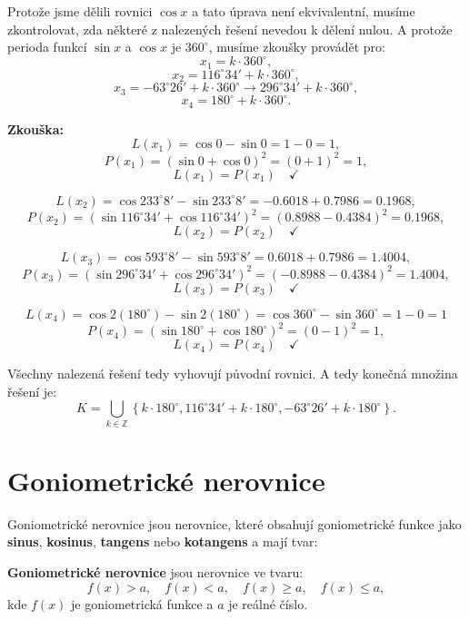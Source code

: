 \documentclass[12pt,a4paper]{article}
\begin{document}
\begin{examplebox}
    \bigskip
    Protože jsme dělili rovnici $\cos x$ a tato úprava není ekvivalentní,
    musíme zkontrolovat, zda některé z nalezených řešení nevedou k dělení nulou.
    A protože perioda funkcí $\sin x$ a $\cos x$ je $360^\circ$, musíme zkoušky provádět pro:
    \[
    x_1 = k \cdot 360^\circ,
    \]
    \[
    x_2 = 116^\circ 34' + k\cdot 360^\circ,
    \]
    \[
    x_3 = -63^\circ 26' + k\cdot 360^\circ \rightarrow 296^\circ 34' + k\cdot 360^\circ,
    \]
    \[
    x_4 = 180^\circ + k\cdot 360^\circ.
    \]

    \textbf{Zkouška:}
    \[
    L(x_1) = \cos 0 - \sin 0 = 1 - 0 = 1,
    \]
    \[
    P(x_1) = (\sin 0 + \cos 0)^2 = (0 + 1)^2 = 1,
    \]
    \[
    L(x_1) = P(x_1) \quad \checkmark
    \]

    \medskip
    \[
    L(x_2) = \cos 233^\circ 8' - \sin 233^\circ 8' = -0.6018 + 0.7986 = 0.1968,
    \]
    \[
    P(x_2) = (\sin 116^\circ 34' + \cos 116^\circ 34')^2 = (0.8988 - 0.4384)^2 = 0.1968,
    \]
    \[
    L(x_2) = P(x_2) \quad \checkmark
    \]

    \medskip
    \[
    L(x_3) = \cos 593^\circ 8' - \sin 593^\circ 8' = 0.6018 + 0.7986 = 1.4004,
    \]
    \[
    P(x_3) = (\sin 296^\circ 34' + \cos 296^\circ 34')^2 = (-0.8988 - 0.4384)^2 = 1.4004,
    \]
    \[
    L(x_3) = P(x_3) \quad \checkmark
    \]

    \medskip
    \[
    L(x_4) = \cos 2 \left(180^\circ\right) - \sin 2 \left(180^\circ\right) = \cos 360^\circ - \sin 360^\circ = 1 - 0 = 1
    \]
    \[
    P(x_4) = (\sin 180^\circ + \cos 180^\circ)^2 = (0 - 1)^2 = 1,
    \]
    \[
    L(x_4) = P(x_4) \quad \checkmark
    \]

    Všechny nalezená řešení tedy vyhovují původní rovnici.
    A tedy konečná množina řešení je:
    \[
    K = \bigcup_{k \in \mathbb{Z}} \left\{k \cdot 180^\circ, 116^\circ 34' + k\cdot 180^\circ, -63^\circ 26' + k\cdot 180^\circ\right\}.
    \]



\end{examplebox}



\section{Goniometrické nerovnice}
Goniometrické nerovnice jsou nerovnice, které obsahují goniometrické funkce jako
\textbf{sinus}, \textbf{kosinus}, \textbf{tangens} nebo \textbf{kotangens} a mají tvar:

\begin{definitionbox}
    \textbf{Goniometrické nerovnice} jsou nerovnice ve tvaru:
    \[
    f(x) > a, \quad f(x) < a, \quad f(x) \geq a, \quad f(x) \leq a,
    \]
    kde $f(x)$ je goniometrická funkce a $a$ je reálné číslo.
\end{definitionbox}
\end{document}
